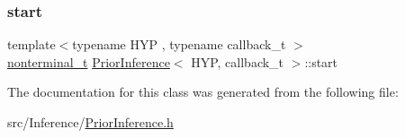 \subsubsection{\texorpdfstring{start}{start}}
{\footnotesize\ttfamily template$<$typename H\+YP , typename callback\+\_\+t $>$ \\
\hyperlink{_nonterminal_8h_a1c5bfe9b903f69c83bbde5da7035fef3}{nonterminal\+\_\+t} \hyperlink{class_prior_inference}{Prior\+Inference}$<$ H\+YP, callback\+\_\+t $>$\+::start}



The documentation for this class was generated from the following file\+:\begin{DoxyCompactItemize}
\item 
src/\+Inference/\hyperlink{_prior_inference_8h}{Prior\+Inference.\+h}\end{DoxyCompactItemize}
